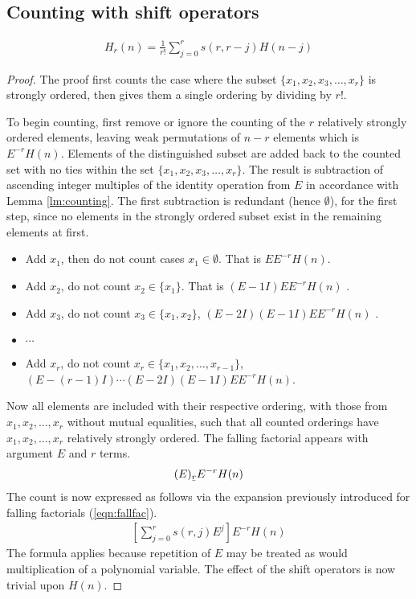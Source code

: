 \documentclass[12pt,reqno]{article}
\newcommand{\ubar}[1]{\text{\b{$#1$}}}
\begin{document}
\subsection{Counting with shift operators}
\begin{theorem}\label{thm:fubinir}

	\begin{align}
		H_{r}(n) = \frac{1}{r!} \sum_{j=0}^{r} s(r,r-j) H(n - j)
	\end{align}

	\begin{proof}
		The proof first counts the case where the subset $\{x_{1}, x_{2}, x_{3}, \ldots, x_{r}\}$ is strongly ordered, then gives them a single ordering by dividing by $r!$.

		To begin counting, first remove or ignore the counting of the $r$ relatively strongly ordered elements, leaving weak permutations of $n - r$ elements which is $E^{- r}H(n)$. Elements of the distinguished subset are added back to the counted set with no ties within the set $\{x_{1}, x_{2}, x_{3}, \ldots, x_{r}\}$. The result is subtraction of ascending integer multiples of the identity operation from $E$ in accordance with Lemma \ref{lm:counting}. The first subtraction is redundant (hence $\emptyset$), for the first step, since no elements in the strongly ordered subset exist in the remaining elements at first.

		\begin{itemize}
			\item{Add $x_{1}$, then do not count cases $x_{1} \in \emptyset$. That is $EE^{-r}H(n)$.}
			\item{Add $x_{2}$, do not count $x_{2} \in\{x_{1}\}$. That is $(E - 1I)EE^{- r}H(n)$ }.
			\item{Add $x_{3}$, do not count $x_{3} \in \{x_{1}, x_{2}\}$, $(E - 2I)(E - 1I)EE^{-r}H(n)$ }.
			\item{$\cdots$}
			\item{Add $x_{r}$, do not count $x_{r} \in \{x_{1}, x_{2}, \ldots ,x_{r - 1}\}$, $(E - (r - 1)I)\cdots(E - 2I)(E - 1I)EE^{-r}H(n)$.}
		\end{itemize}
		Now all elements are included with their respective ordering, with those from $x_{1}, x_{2}, \ldots, x_{r}$ without mutual equalities, such that all counted orderings have $x_{1}, x_{2}, \ldots, x_{r}$ relatively strongly ordered. The falling factorial appears with argument $E$ and $r$ terms.
		\begin{align}
			(E)_{\ubar{r}} E^{-r} H(n)
		\end{align}
		The count is now expressed as follows via the expansion previously introduced for falling factorials (\ref{eqn:fallfac}).
		\begin{align}
			 \left[ \sum_{j = 0}^{r} s(r,j)E^{j} \right] E^{-r} H(n)
		\end{align}
		The formula applies because repetition of $E$ may be treated as would multiplication of a polynomial variable. The effect of the shift operators is now trivial upon $H(n)$.


\end{proof}
\end{theorem}
\end{document}
